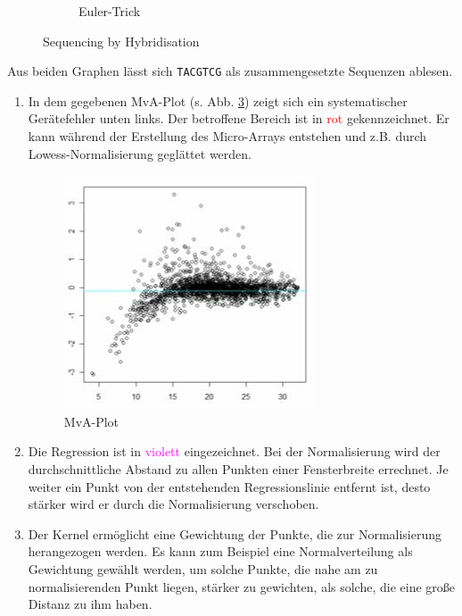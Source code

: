 \documentclass{homework}
\begin{document}
\begin{enumerate}
\begin{enumerate}
\begin{figure}
\begin{subfigure}{0.5\linewidth}
\caption{Euler-Trick}
\label{fig:42bb}
\end{subfigure}

\caption{Sequencing by Hybridisation}
\end{figure}

Aus beiden Graphen lässt sich \texttt{TACGTCG} als zusammengesetzte Sequenzen ablesen.
\end{enumerate}

\begin{enumerate}
\item In dem gegebenen MvA-Plot (s. Abb. \ref{fig:43}) zeigt sich ein systematischer Gerätefehler unten links.
Der betroffene Bereich ist in \textcolor{red}{rot} gekennzeichnet.
Er kann während der Erstellung des Micro-Arrays entstehen und z.B. durch Lowess-Normalisierung geglättet werden.

\begin{figure}
\centering
\includegraphics{data/albi_ueb11_a43_mva}
\caption{MvA-Plot}
\label{fig:43}
\end{figure}

\item Die Regression ist in \textcolor{magenta}{violett} eingezeichnet.
Bei der Normalisierung wird der durchschnittliche Abstand zu allen Punkten einer Fensterbreite errechnet.
Je weiter ein Punkt von der entstehenden Regressionslinie entfernt ist, desto stärker wird er durch die Normalisierung verschoben.

\item Der Kernel ermöglicht eine Gewichtung der Punkte, die zur Normalisierung herangezogen werden.
Es kann zum Beispiel eine Normalverteilung als Gewichtung gewählt werden, um solche Punkte, die nahe am zu normalisierenden Punkt liegen,
stärker zu gewichten, als solche, die eine große Distanz zu ihm haben.
\end{enumerate}


\end{enumerate}
\end{document}
